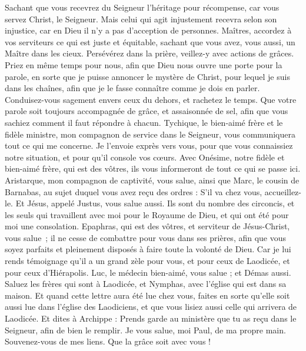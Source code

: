 \begin{multicols}{2}
Sachant que vous recevrez du Seigneur l’héritage pour récompense, car vous servez Christ, le Seigneur.
Mais celui qui agit injustement recevra selon son injustice, car en Dieu il n'y a pas d’acception de personnes.
\VerseOne{}Maîtres, accordez à vos serviteurs ce qui est juste et équitable, sachant que vous avez, vous aussi, un Maître dans les cieux.
Persévérez dans la prière, veillez-y avec actions de grâces.
Priez en même temps pour nous, afin que Dieu nous ouvre une porte pour la parole, en sorte que je puisse annoncer le mystère de Christ, pour lequel je suis dans les chaînes,
afin que je le fasse connaître comme je dois en parler.
Conduisez-vous sagement envers ceux du dehors, et rachetez le temps.
Que votre parole soit toujours accompagnée de grâce, et assaisonnée de sel, afin que vous sachiez comment il faut répondre à chacun.
Tychique, le bien-aimé frère et le fidèle ministre, mon compagnon de service dans le Seigneur, vous communiquera tout ce qui me concerne.
Je l’envoie exprès vers vous, pour que vous connaissiez notre situation, et pour qu’il console vos cœurs.
Avec Onésime, notre fidèle et bien-aimé frère, qui est des vôtres, ils vous informeront de tout ce qui se passe ici.
Aristarque, mon compagnon de captivité, vous salue, ainsi que Marc, le cousin de Barnabas, au sujet duquel vous avez reçu des ordres : S'il va chez vous, accueillez-le.
Et Jésus, appelé Justus, vous salue aussi. Ils sont du nombre des circoncis, et les seuls qui travaillent avec moi pour le Royaume de Dieu, et qui ont été pour moi une consolation.
Epaphras, qui est des vôtres, et serviteur de Jésus-Christ, vous salue ; il ne cesse de combattre pour vous dans ses prières, afin que vous soyez parfaits et pleinement disposés à faire toute la volonté de Dieu.
Car je lui rends témoignage qu'il a un grand zèle pour vous, et pour ceux de Laodicée, et pour ceux d'Hiérapolis.
Luc, le médecin bien-aimé, vous salue ; et Démas aussi.
Saluez les frères qui sont à Laodicée, et Nymphas, avec l'église qui est dans sa maison.
Et quand cette lettre aura été lue chez vous, faites en sorte qu'elle soit aussi lue dans l'église des Laodiciens, et que vous lisiez aussi celle qui arrivera de Laodicée.
Et dites à Archippe : Prends garde au ministère que tu as reçu dans le Seigneur, afin de bien le remplir.
Je vous salue, moi Paul, de ma propre main. Souvenez-vous de mes liens. Que la grâce soit avec vous !
\PPE{}
\end{multicols}
